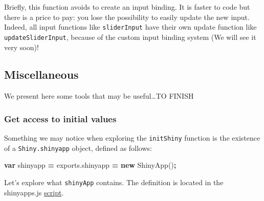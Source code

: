 \documentclass[]{book}
\newenvironment{Shaded}{\begin{snugshade}}{\end{snugshade}}
\newcommand{\AttributeTok}[1]{\textcolor[rgb]{0.77,0.63,0.00}{#1}}
\newcommand{\KeywordTok}[1]{\textcolor[rgb]{0.13,0.29,0.53}{\textbf{#1}}}
\newcommand{\NormalTok}[1]{#1}
\newcommand{\OperatorTok}[1]{\textcolor[rgb]{0.81,0.36,0.00}{\textbf{#1}}}
\newcommand{\VariableTok}[1]{\textcolor[rgb]{0.00,0.00,0.00}{#1}}
\begin{document}
Briefly, this function avoids to create an input binding. It is faster to code but there is a price to pay: you lose the possibility to easily update the new input. Indeed, all input functions like \texttt{sliderInput} have their own update function like \texttt{updateSliderInput}, because of the custom input binding system (We will see it very soon)!

\hypertarget{miscellaneous}{%
\subsection{Miscellaneous}\label{miscellaneous}}

We present here some tools that may be useful\ldots{}TO FINISH

\hypertarget{get-access-to-initial-values}{%
\subsubsection{Get access to initial values}\label{get-access-to-initial-values}}

Something we may notice when exploring the \texttt{initShiny} function is the existence of a \texttt{Shiny.shinyapp} object, defined as follows:

\begin{Shaded}
\begin{Highlighting}[]
\KeywordTok{var}\NormalTok{ shinyapp }\OperatorTok{=} \VariableTok{exports}\NormalTok{.}\AttributeTok{shinyapp} \OperatorTok{=} \KeywordTok{new} \AttributeTok{ShinyApp}\NormalTok{()}\OperatorTok{;}
\end{Highlighting}
\end{Shaded}

Let's explore what \texttt{shinyApp} contains. The definition is located in the shinyapps.js \href{https://github.com/rstudio/shiny/blob/master/srcjs/shinyapp.js}{script}.
\end{document}
